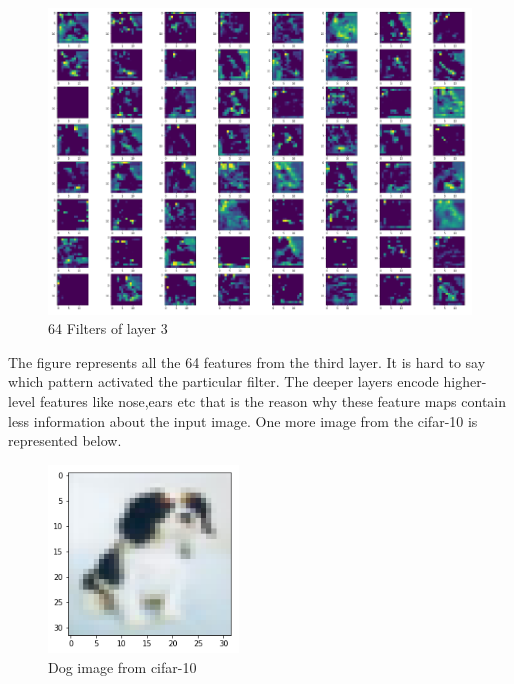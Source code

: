 \begin{figure}[h]
    \centering
    \includegraphics[width=1.0\textwidth]{thesis_template/images/horsefil3.png}
    \caption{\small 64 Filters of layer 3}
    \label{}
    \end{figure}
\newpage \noindent The figure represents all the 64 features from the third layer. It is hard to say which pattern activated the particular filter. The deeper layers encode higher-level features like nose,ears etc that is the reason why these feature maps contain less information about the input image. One more image from the cifar-10 is represented below.


\begin{figure}[h]
    \centering
    \includegraphics[width=0.45\textwidth]{thesis_template/images/dog1.png}
    \caption{\small Dog image from cifar-10}
    \label{}
    \end{figure}

